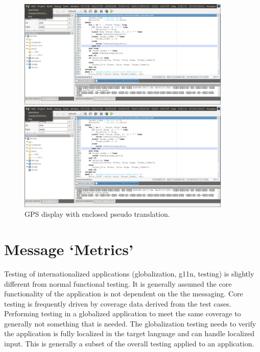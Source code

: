 \begin{figure}
\begin{center}
\begin{latexonly}
    \includegraphics[angle=90,width=4in]{images/gps-enclosed.png}
\end{latexonly}
\begin{htmlonly}
    \includegraphics[width=4in]{images/gps-enclosed.png}
\end{htmlonly}
\end{center}
\caption{GPS display with enclosed pseudo translation.}
\label{fig:gps-enclosed}
\end{figure}

\section{Message `Metrics'}

Testing of internationalized applications (globalization, g11n, testing) is
slightly different from normal functional testing.  It is generally assumed
the core functionality of the application is not dependent on the the messaging.
Core testing is frequently driven by coverage data derived from the test
cases.  Performing testing in a globalized application to meet the same
coverage to generally not something that is needed.  The globalization
testing needs to verify the application is fully localized in the target
language and can handle localized input.  This is generally a subset of
the overall testing applied to an application.

